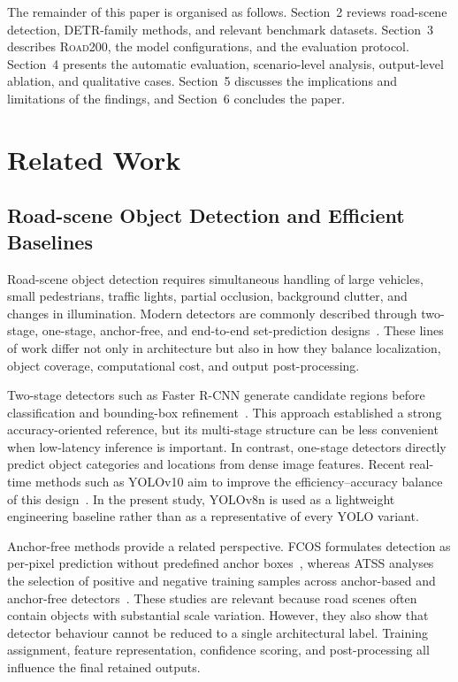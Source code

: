 \documentclass[runningheads]{llncs}
\begin{document}
The remainder of this paper is organised as follows. Section~2 reviews road-scene detection, DETR-family methods, and relevant benchmark datasets. Section~3 describes \textsc{Road200}, the model configurations, and the evaluation protocol. Section~4 presents the automatic evaluation, scenario-level analysis, output-level ablation, and qualitative cases. Section~5 discusses the implications and limitations of the findings, and Section~6 concludes the paper.

\section{Related Work}

\subsection{Road-scene Object Detection and Efficient Baselines}

Road-scene object detection requires simultaneous handling of large vehicles, small pedestrians, traffic lights, partial occlusion, background clutter, and changes in illumination. Modern detectors are commonly described through two-stage, one-stage, anchor-free, and end-to-end set-prediction designs~\cite{zou2023survey}. These lines of work differ not only in architecture but also in how they balance localization, object coverage, computational cost, and output post-processing.

Two-stage detectors such as Faster R-CNN generate candidate regions before classification and bounding-box refinement~\cite{ren2015faster}. This approach established a strong accuracy-oriented reference, but its multi-stage structure can be less convenient when low-latency inference is important. In contrast, one-stage detectors directly predict object categories and locations from dense image features. Recent real-time methods such as YOLOv10 aim to improve the efficiency--accuracy balance of this design~\cite{wang2024yolov10}. In the present study, YOLOv8n is used as a lightweight engineering baseline rather than as a representative of every YOLO variant.

Anchor-free methods provide a related perspective. FCOS formulates detection as per-pixel prediction without predefined anchor boxes~\cite{tian2019fcos}, whereas ATSS analyses the selection of positive and negative training samples across anchor-based and anchor-free detectors~\cite{zhang2020atss}. These studies are relevant because road scenes often contain objects with substantial scale variation. However, they also show that detector behaviour cannot be reduced to a single architectural label. Training assignment, feature representation, confidence scoring, and post-processing all influence the final retained outputs.
\end{document}

